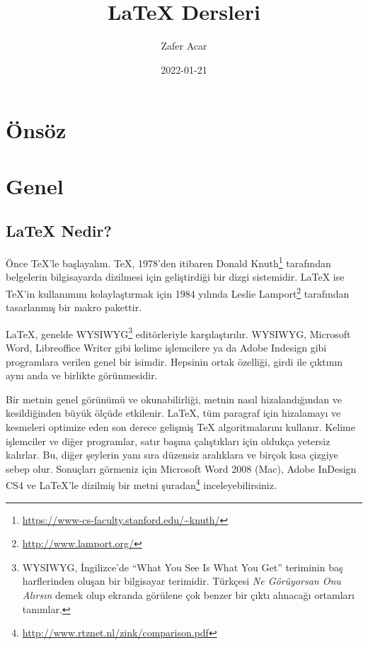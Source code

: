 \documentclass[
  10pt,
]{scrbook}
\title{LaTeX Dersleri}
\author{Zafer Acar}
\date{2022-01-21}
\renewcommand{\href}[2]{#2\footnote{\url{#1}}}
\begin{document}
\maketitle



{
\setcounter{tocdepth}{2}
\tableofcontents
}
\listoffigures
\listoftables
\hypertarget{uxf6nsuxf6z}{%
\chapter*{Önsöz}\label{uxf6nsuxf6z}}


\mainmatter

\hypertarget{genel}{%
\chapter{Genel}\label{genel}}

\hypertarget{latex-nedir}{%
\section{LaTeX Nedir?}\label{latex-nedir}}

Önce TeX'le başlayalım. TeX, 1978'den
itibaren \href{https://www-cs-faculty.stanford.edu/~knuth/}{Donald Knuth} tarafından belgelerin bilgisayarda dizilmesi
için geliştirdiği bir dizgi sistemidir.
LaTeX ise TeX'in kullanımını kolaylaştırmak için 1984 yılında \href{http://www.lamport.org/}{Leslie
Lamport} tarafından tasarlanmış bir makro pakettir.

LaTeX, genelde WYSIWYG\footnote{WYSIWYG, İngilizce'de ``What You See Is What You Get'' teriminin baş harflerinden oluşan bir bilgisayar terimidir. Türkçesi \emph{Ne Görüyorsan Onu Alırsın} demek olup ekranda görülene çok benzer bir çıktı alınacağı ortamları tanımlar.} editörleriyle karşılaştırılır. WYSIWYG, Microsoft
Word, Libreoffice Writer gibi kelime işlemcilere ya da Adobe Indesign
gibi programlara verilen genel bir isimdir. Hepsinin ortak özelliği,
girdi ile çıktının aynı anda ve birlikte görünmesidir.

Bir metnin genel görünümü ve okunabilirliği, metnin nasıl
hizalandığından ve kesildiğinden büyük ölçüde etkilenir. LaTeX, tüm
paragraf için hizalamayı ve kesmeleri optimize eden son derece gelişmiş
TeX algoritmalarını kullanır. Kelime işlemciler ve diğer programlar,
satır başına çalıştıkları için oldukça yetersiz kalırlar. Bu, diğer
şeylerin yanı sıra düzensiz aralıklara ve birçok kısa çizgiye sebep
olur. Sonuçları görmeniz için Microsoft Word 2008 (Mac), Adobe InDesign
CS4 ve LaTeX'le dizilmiş bir metni \href{http://www.rtznet.nl/zink/comparison.pdf}{şuradan} inceleyebilirsiniz.
\end{document}
